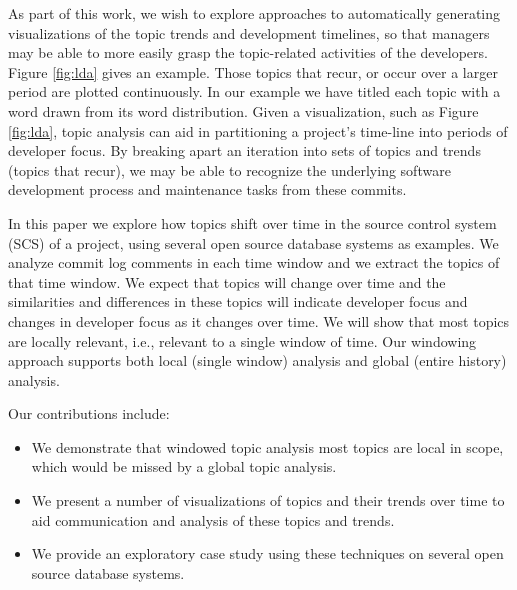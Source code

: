 \documentclass[times, 10pt,twocolumn]{article}
\begin{document}
As part of this work, we wish to explore approaches to automatically
generating visualizations of the topic trends and development timelines, so
that managers may be able to more easily grasp the topic-related
activities of the developers.  Figure \ref{fig:lda} gives an example.
Those topics that
recur, or occur over a larger period are plotted continuously. In our
example we have titled each topic with a word drawn from its
word distribution.  
Given a visualization, such as Figure \ref{fig:lda}, topic
analysis can aid in partitioning a project's time-line into periods of
developer focus.
By breaking apart an iteration into sets of topics
and trends (topics that recur), we may be able to recognize the
underlying software development process and maintenance tasks from these
commits. 




In this paper we explore how topics shift over time in the source
control system (SCS) of a project, using several open source database
systems as examples. We analyze commit log comments in each time
window and we extract the topics of that time window. We expect that
topics will change over time and the similarities and differences in
these topics will indicate developer focus and changes in developer
focus as it changes over time. We will show that most topics are
locally relevant, i.e., relevant to a single window of time.  
Our windowing approach supports both local (single window) analysis
and global (entire history) analysis.


Our contributions include:
\begin{itemize}
\item We demonstrate that windowed topic analysis most topics are local
  in scope, which would be missed by a global topic analysis.
\item We present a number of visualizations of topics and their trends over time to aid
  communication and analysis of these topics and trends.
\item We provide an exploratory case study using these techniques on
  several open source database systems.
\end{itemize}
\end{document}
